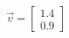 \documentclass[preview]{standalone}
\begin{document}
\begin{align*}
\vec{v}=\begin{bmatrix}1.4\\0.9\end{bmatrix}
\end{align*}
\end{document}
